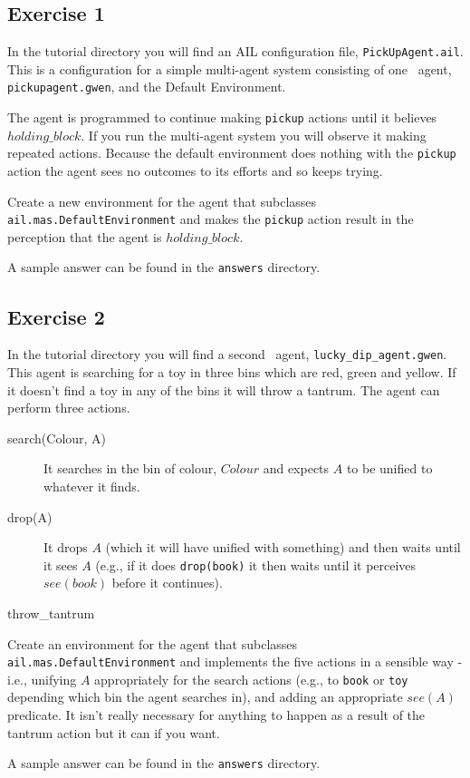 \documentclass[a4]{article}
\begin{document}
\subsection{Exercise 1}
In the tutorial directory you will find an AIL configuration file, \texttt{PickUpAgent.ail}.  This is a configuration for a simple multi-agent system consisting of one \gwendolen\ agent, \texttt{pickupagent.gwen}, and the Default Environment.

The agent is programmed to continue making \texttt{pickup} actions  until it believes $holding\_block$.  If you run the multi-agent system you will observe it making repeated actions.  Because the default environment does nothing with the \texttt{pickup} action the agent sees no outcomes to its efforts and so keeps trying.

\begin{sloppypar}
Create a new environment for the agent that subclasses \texttt{ail.mas.DefaultEnvironment} and makes the \texttt{pickup} action result in the perception that the agent is $holding\_block$.
\end{sloppypar}

A sample answer can be found in the \texttt{answers} directory.

\subsection{Exercise 2}
\begin{sloppypar}
In the tutorial directory you will find a second \gwendolen\ agent, \texttt{lucky\_dip\_agent.gwen}.  This agent is searching for a toy in three bins which are red, green and yellow.  If it doesn't find a toy in any of the bins it will throw a tantrum.  The agent can perform three actions.
\end{sloppypar}

\begin{description}
\item[search(Colour, A)] It searches in the bin of colour, $Colour$ and expects $A$ to be unified to whatever it finds. 
\item[drop(A)] It drops $A$ (which it will have unified with something) and then waits until it sees $A$ (e.g., if it does \texttt{drop(book)} it then waits until it perceives $see(book)$ before it continues).
\item[throw\_tantrum]
\end{description}

\begin{sloppypar}
Create an environment for the agent that subclasses \texttt{ail.mas.DefaultEnvironment} and implements the five actions in a sensible way - i.e., unifying $A$ appropriately for the search actions (e.g., to \texttt{book} or \texttt{toy} depending which bin the agent searches in), and adding an appropriate $see(A)$ predicate.  It isn't really necessary for anything to happen as a result of the tantrum action but it can if you want.
\end{sloppypar}

A sample answer can be found in the \texttt{answers} directory.
\end{document}
